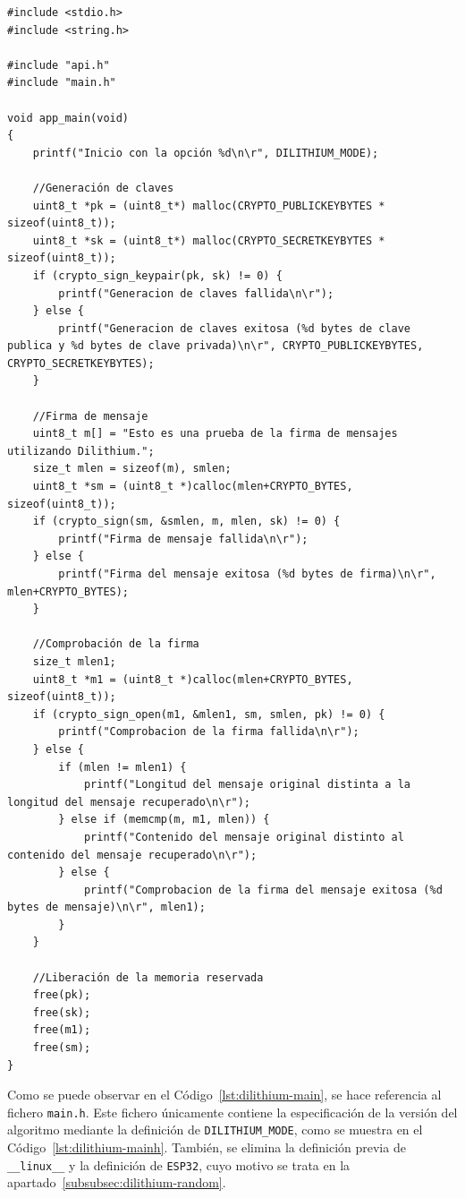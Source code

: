 \begin{lstlisting}[label={lst:dilithium-main},style=Cnice,firstnumber=1,caption={Archivo \texttt{Dilithium/main/main.c}.}]
#include <stdio.h>
#include <string.h>

#include "api.h"
#include "main.h"
    
void app_main(void)
{
    printf("Inicio con la opción %d\n\r", DILITHIUM_MODE);

    //Generación de claves
    uint8_t *pk = (uint8_t*) malloc(CRYPTO_PUBLICKEYBYTES * sizeof(uint8_t));
    uint8_t *sk = (uint8_t*) malloc(CRYPTO_SECRETKEYBYTES * sizeof(uint8_t));
    if (crypto_sign_keypair(pk, sk) != 0) {
        printf("Generacion de claves fallida\n\r");
    } else {
        printf("Generacion de claves exitosa (%d bytes de clave publica y %d bytes de clave privada)\n\r", CRYPTO_PUBLICKEYBYTES, CRYPTO_SECRETKEYBYTES);
    }

    //Firma de mensaje
    uint8_t m[] = "Esto es una prueba de la firma de mensajes utilizando Dilithium.";
    size_t mlen = sizeof(m), smlen;
    uint8_t *sm = (uint8_t *)calloc(mlen+CRYPTO_BYTES, sizeof(uint8_t));
    if (crypto_sign(sm, &smlen, m, mlen, sk) != 0) {
        printf("Firma de mensaje fallida\n\r");
    } else {
        printf("Firma del mensaje exitosa (%d bytes de firma)\n\r", mlen+CRYPTO_BYTES);
    }

    //Comprobación de la firma
    size_t mlen1;
    uint8_t *m1 = (uint8_t *)calloc(mlen+CRYPTO_BYTES, sizeof(uint8_t));
    if (crypto_sign_open(m1, &mlen1, sm, smlen, pk) != 0) {
        printf("Comprobacion de la firma fallida\n\r");
    } else {
        if (mlen != mlen1) {
            printf("Longitud del mensaje original distinta a la longitud del mensaje recuperado\n\r");
        } else if (memcmp(m, m1, mlen)) {
            printf("Contenido del mensaje original distinto al contenido del mensaje recuperado\n\r");
        } else {
            printf("Comprobacion de la firma del mensaje exitosa (%d bytes de mensaje)\n\r", mlen1);
        }
    }

    //Liberación de la memoria reservada
    free(pk);
    free(sk);
    free(m1);
    free(sm);
}
\end{lstlisting}

Como se puede observar en el Código~\ref{lst:dilithium-main}, se hace referencia al fichero \texttt{main.h}.
Este fichero únicamente contiene la especificación de la versión del algoritmo mediante la definición de \texttt{DILITHIUM\_MODE}, como se muestra en el Código~\ref{lst:dilithium-mainh}.
También, se elimina la definición previa de \texttt{\_\_linux\_\_} y la definición de \texttt{ESP32}, cuyo motivo se trata en la apartado~\ref{subsubsec:dilithium-random}.


